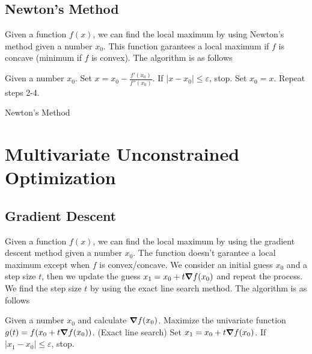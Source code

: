 \documentclass{report}
\begin{document}
\subsection{Newton's Method}

Given a function $f(x)$, we can find the local maximum by using Newton's method given a number $x_0$. This function garantees a local maximum if $f$ is concave (minimum if $f$ is convex). The algorithm is as follows

\begin{enumerate}
	\ii Given a number $x_0$.
	\ii Set $x=x_0-\frac{f'(x_0)}{f''(x_0)}$.
	\ii If $|x-x_0| \leq \varepsilon$, stop.
	\ii Set $x_0=x$.
	\ii Repeat steps 2-4.
\end{enumerate}

\begin{algorithm}
	\SetAlgoLined
	\caption{Newton's Method}
\end{algorithm}

\section{Multivariate Unconstrained Optimization}

\subsection{Gradient Descent}

Given a function $f(x)$, we can find the local maximum by using the gradient descent method given a number $x_0$. The function doesn't garantee a local maximum except when $f$ is convex/concave. We consider an initial guess $x_0$ and a step size $t$, then we update the guess $x_1=x_0+t\grad{f(x_0)}$ and repeat the process. We find the step size $t$ by using the exact line search method. The algorithm is as follows

\begin{enumerate}
	\ii Given a number $x_0$ and calculate $\grad{f(x_0)}$.
	\ii Maximize the univariate function $g(t)=f(x_0+t\grad{f(x_0)})$. (Exact line search)
	\ii Set $x_1=x_0+t\grad{f(x_0)}$.
	\ii If $|x_1-x_0| \leq \varepsilon$, stop.
\end{enumerate}
\end{document}
